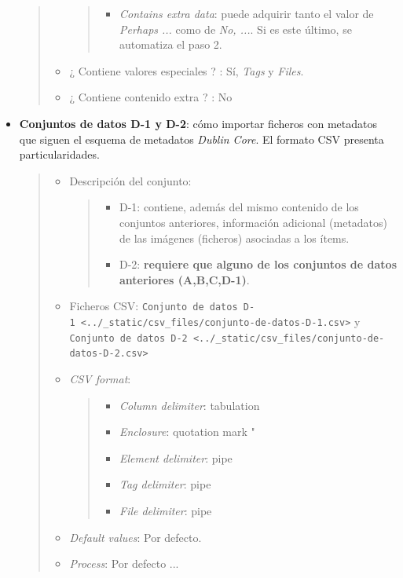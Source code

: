 \documentclass[
]{article}
\providecommand{\tightlist}{%
  \setlength{\itemsep}{0pt}\setlength{\parskip}{0pt}}
\begin{document}
\begin{itemize}
\begin{quote}
\begin{itemize}
    \begin{quote}
    \begin{itemize}
    \tightlist
    \item
      \emph{Contains extra data}: puede adquirir tanto el valor de
      \emph{Perhaps ...} como de \emph{No, ...}. Si es este último, se
      automatiza el paso 2.
    \end{itemize}
    \end{quote}
  \item
    ¿ Contiene valores especiales ? : Sí, \emph{Tags} y \emph{Files}.
  \item
    ¿ Contiene contenido extra ? : No
  \end{itemize}
  \end{quote}
\item
  \textbf{Conjuntos de datos D-1 y D-2}: cómo importar ficheros con
  metadatos que siguen el esquema de metadatos \emph{Dublin Core}. El
  formato CSV presenta particularidades.

  \begin{quote}
  \begin{itemize}
  \item
    Descripción del conjunto:

    \begin{quote}
    \begin{itemize}
    \tightlist
    \item
      D-1: contiene, además del mismo contenido de los conjuntos
      anteriores, información adicional (metadatos) de las imágenes
      (ficheros) asociadas a los ítems.
    \item
      D-2: \textbf{requiere que alguno de los conjuntos de datos
      anteriores (A,B,C,D-1)}.
    \end{itemize}
    \end{quote}
  \item
    Ficheros CSV:
    \texttt{Conjunto\ de\ datos\ D-1\ \textless{}../\_static/csv\_files/conjunto-de-datos-D-1.csv\textgreater{}}
    y
    \texttt{Conjunto\ de\ datos\ D-2\ \textless{}../\_static/csv\_files/conjunto-de-datos-D-2.csv\textgreater{}}
  \item
    \emph{CSV format}:

    \begin{quote}
    \begin{itemize}
    \tightlist
    \item
      \emph{Column delimiter}: tabulation
    \item
      \emph{Enclosure}: quotation mark "
    \item
      \emph{Element delimiter}: pipe
    \item
      \emph{Tag delimiter}: pipe
    \item
      \emph{File delimiter}: pipe
    \end{itemize}
    \end{quote}
  \item
    \emph{Default values}: Por defecto.
  \item
    \emph{Process}: Por defecto ...


\end{itemize}
\end{quote}
\end{itemize}
\end{document}
